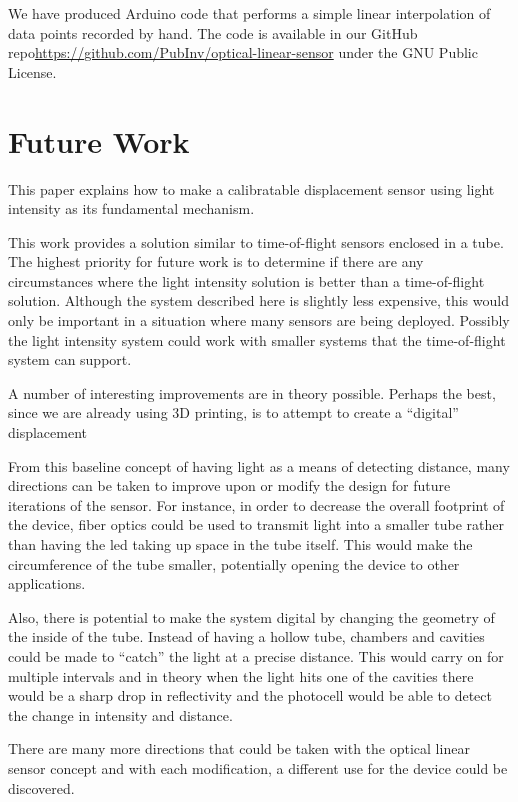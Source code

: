 \documentclass[10pt,conference,compsocconf]{IEEEtran}
\begin{document}
We have produced Arduino code that performs a simple linear
interpolation of data points recorded by hand. The code is available
in our GitHub repo\url{https://github.com/PubInv/optical-linear-sensor}\cite{SourceCode}
under the GNU Public License. 

\section{Future Work}

This paper explains how to make a calibratable displacement sensor
using light intensity as its fundamental mechanism.

This work provides a solution similar to time-of-flight\cite{TimeOfFlight} sensors enclosed in
a tube. The highest priority for future work is to determine if there are any circumstances
where the light intensity solution is better than a time-of-flight solution.
Although the system described here is slightly less expensive, this would only
be important in a situation where many sensors are being deployed. Possibly the light intensity
system could work with smaller systems that the time-of-flight system can support.

A number of interesting improvements are in theory possible. Perhaps
the best, since we are already using 3D printing, is to attempt to
create a “digital” displacement

From this baseline concept of having light as a means of detecting
distance, many directions can be taken to improve upon or modify the
design for future iterations of the sensor. For instance, in order to
decrease the overall footprint of the device, fiber optics could be
used to transmit light into a smaller tube rather than having the led
taking up space in the tube itself. This would make the circumference
of the tube smaller, potentially opening the device to other
applications.

Also, there is potential to make the system digital by changing the
geometry of the inside of the tube. Instead of having a hollow tube,
chambers and cavities could be made to “catch” the light at a precise
distance. This would carry on for multiple intervals and in theory
when the light hits one of the cavities there would be a sharp drop in
reflectivity and the photocell would be able to detect the change in
intensity and distance.

There are many more directions that could be taken with the optical
linear sensor concept and with each modification, a different use for
the device could be discovered.
\end{document}
